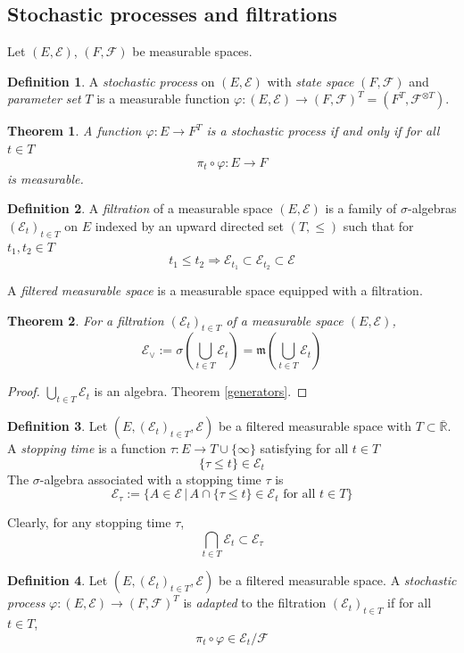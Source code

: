 \documentclass[11pt, a4paper, openany]{book}
\newtheorem{thm}{Theorem}\newtheorem{lem}{Lemma}\newtheorem{crl}{Corollary}
\theoremstyle{definition}
\newtheorem{define}{Definition}\newtheorem{exam}{Example}\newtheorem{remark}{Remark}
\newcommand{\er}{\overline{\mathbb{R}}}
\begin{document}
\subsection{Stochastic processes and filtrations}
    Let $(E,\mathscr{E})$, $(F,\mathscr{F})$ be measurable spaces.
    \begin{define}
        A \textit{stochastic process} on $(E,\mathscr{E})$ with \textit{state space} $(F,\mathscr{F})$ and \textit{parameter set} $T$ is a measurable function $\varphi:(E,\mathscr{E})\rightarrow (F,\mathscr{F})^T=(F^T,\mathscr{F}^{\otimes T})$.
    \end{define}
    \begin{thm}
        A function $\varphi:E\rightarrow F^T$ is a stochastic process if and only if for all $t\in T$
        \[
            \pi_t\circ \varphi:E\rightarrow F
        \]
        is measurable.
    \end{thm}
    \begin{define}
        A \textit{filtration} of a measurable space $(E,\mathscr{E})$ is a family of $\sigma$-algebras $(\mathscr{E}_t)_{t\in T}$ on $E$ indexed by an upward directed set $(T,\leqslant)$ such that for $t_1,t_2\in T$
        \[
            t_1\leqslant t_2\Longrightarrow \mathscr{E}_{t_1}\subset \mathscr{E}_{t_2}\subset\mathscr{E}
        \]

        A \textit{filtered measurable space} is a measurable space equipped with a filtration.
    \end{define}
    \begin{thm}
        For a filtration $(\mathscr{E}_t)_{t\in T}$ of a measurable space $(E,\mathscr{E})$,
        \[
            \mathscr{E}_\vee:=\sigma\left(\bigcup_{t\in T}\mathscr{E}_t\right)=\mathfrak{m}\left(\bigcup_{t\in T}\mathscr{E}_t\right)
        \]
    \end{thm}
    \begin{proof}
        $\bigcup_{t\in T}\mathscr{E}_t$ is an algebra. Theorem \ref{generators}.
    \end{proof}
    \begin{define}
        Let $(E,(\mathscr{E}_t)_{t\in T},\mathscr{E})$ be a filtered measurable space with $T\subset \er$. A \textit{stopping time} is a function $\tau:E\rightarrow T\cup\{\infty\}$ satisfying for all $t\in T$
        \[
            \{\tau\leqslant t\}\in\mathscr{E}_t
        \]
        The $\sigma$-algebra associated with a stopping time $\tau$ is
        \[
            \mathscr{E}_\tau:=\{A\in\mathscr{E}\,|\,A\cap \{\tau\leqslant t\}\in \mathscr{E}_t\text{ for all }t\in T\}
        \]
    \end{define}
    Clearly, for any stopping time $\tau$,
    \[
        \bigcap_{t\in T}\mathscr{E}_t\subset \mathscr{E}_\tau
    \]
    \begin{define}
        Let $(E,(\mathscr{E}_t)_{t\in T},\mathscr{E})$ be a filtered measurable space.
        A \textit{stochastic process} $\varphi:(E,\mathscr{E})\rightarrow (F,\mathscr{F})^T$ is \textit{adapted} to the filtration $(\mathscr{E}_t)_{t\in T}$ if for all $t\in T$,
        \[
            \pi_t\circ \varphi\in \mathscr{E}_t/\mathscr{F}
        \]
    \end{define}
\end{document}
